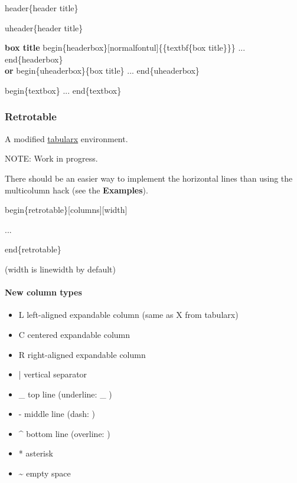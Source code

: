 \documentclass[english,12pt,openany,letterpaper]{book}
\begin{document}

\bs header\{header title\}

\skipline


\bs uheader\{header title\}

\skipline

\begin{uheaderbox}{\textbf{box title}}
	\bs begin\{headerbox\}[\bs normalfont\bs ul]\{\{\bs textbf\{box title\}\}\} ... \bs end\{headerbox\}
	\\\textbf{or}
	\bs begin\{uheaderbox\}\{box title\} ... \bs end\{uheaderbox\}
\end{uheaderbox}

\begin{textbox}
	\bs begin\{textbox\} ... \bs end\{textbox\}
\end{textbox}

\break


\subsubsection{Retrotable}

A modified \href{https://www.ctan.org/pkg/tabularx}{tabularx} environment.

\begin{tabbox}[4][4]
	\begin{headerbox}{NOTE:}
		Work in progress.
		
		There should be an easier way to implement the horizontal lines than using the \bs multicolumn hack (see the \textbf{Examples}).
	\end{headerbox}
\end{tabbox}

\bs begin\{retrotable\}[columns][width]

\tab ...

\bs end\{retrotable\}

(width is \bs linewidth by default)

\skipline

\paragraph{New column types}

\begin{itemize}
	\item L left-aligned expandable column (same as X from tabularx)
	\item C centered expandable column
	\item R right-aligned expandable column
	\item | vertical separator
	\item \_ top line (underline: \_ )
	\item - middle line (dash: \dash{} )
	\item \^{} bottom line (overline: \ol{~} )
	\item * asterisk
	\item \~{} empty space
\end{itemize}
\end{document}
